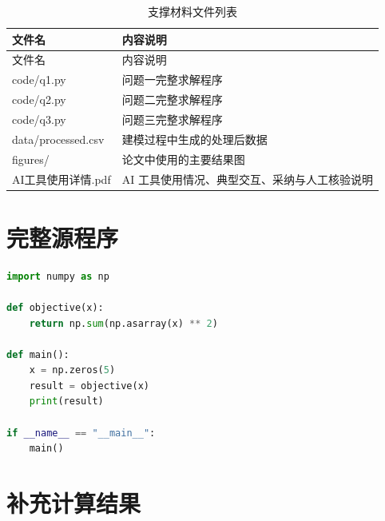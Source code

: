 \documentclass[UTF8,fontset=windows,a4paper,12pt]{ctexart}
\begin{document}
\begin{longtable}{p{}p{}}
  \caption{支撑材料文件列表}\label{tab:support-files}\\
  \toprule
  文件名 & 内容说明 \\
  \midrule
  \endfirsthead

  \toprule
  文件名 & 内容说明 \\
  \midrule
  \endhead

  code/q1.py & 问题一完整求解程序 \\
  code/q2.py & 问题二完整求解程序 \\
  code/q3.py & 问题三完整求解程序 \\
  data/processed.csv & 建模过程中生成的处理后数据 \\
  figures/ & 论文中使用的主要结果图 \\
  AI工具使用详情.pdf & AI 工具使用情况、典型交互、采纳与人工核验说明 \\
  \bottomrule
\end{longtable}


\section{完整源程序}

%
%

\begin{lstlisting}[language=Python,caption={问题一完整程序示例},label={code:q1}]
import numpy as np

def objective(x):
    return np.sum(np.asarray(x) ** 2)

def main():
    x = np.zeros(5)
    result = objective(x)
    print(result)

if __name__ == "__main__":
    main()
\end{lstlisting}

\section{补充计算结果}

\end{document}
